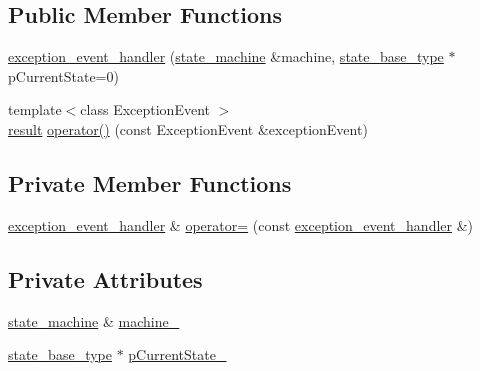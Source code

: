 \subsection*{Public Member Functions}
\begin{DoxyCompactItemize}
\item 
\mbox{\hyperlink{classboost_1_1statechart_1_1state__machine_1_1exception__event__handler_aa599923f8455a41fc5b3cb5f85696e37}{exception\+\_\+event\+\_\+handler}} (\mbox{\hyperlink{classboost_1_1statechart_1_1state__machine}{state\+\_\+machine}} \&machine, \mbox{\hyperlink{classboost_1_1statechart_1_1state__machine_a69cc258c29fcabec25c5dc8bedb7d530}{state\+\_\+base\+\_\+type}} $\ast$p\+Current\+State=0)
\item 
{\footnotesize template$<$class Exception\+Event $>$ }\\\mbox{\hyperlink{namespaceboost_1_1statechart_abe807f6598b614d6d87bb951ecd92331}{result}} \mbox{\hyperlink{classboost_1_1statechart_1_1state__machine_1_1exception__event__handler_ab9b740e63c87c7de5e0890951bdc5e69}{operator()}} (const Exception\+Event \&exception\+Event)
\end{DoxyCompactItemize}
\subsection*{Private Member Functions}
\begin{DoxyCompactItemize}
\item 
\mbox{\hyperlink{classboost_1_1statechart_1_1state__machine_1_1exception__event__handler}{exception\+\_\+event\+\_\+handler}} \& \mbox{\hyperlink{classboost_1_1statechart_1_1state__machine_1_1exception__event__handler_aeb4e0a3fcad26c9e187369570563d1dc}{operator=}} (const \mbox{\hyperlink{classboost_1_1statechart_1_1state__machine_1_1exception__event__handler}{exception\+\_\+event\+\_\+handler}} \&)
\end{DoxyCompactItemize}
\subsection*{Private Attributes}
\begin{DoxyCompactItemize}
\item 
\mbox{\hyperlink{classboost_1_1statechart_1_1state__machine}{state\+\_\+machine}} \& \mbox{\hyperlink{classboost_1_1statechart_1_1state__machine_1_1exception__event__handler_a72a5fde90e24066f54b90f96b7bbed24}{machine\+\_\+}}
\item 
\mbox{\hyperlink{classboost_1_1statechart_1_1state__machine_a69cc258c29fcabec25c5dc8bedb7d530}{state\+\_\+base\+\_\+type}} $\ast$ \mbox{\hyperlink{classboost_1_1statechart_1_1state__machine_1_1exception__event__handler_a215e864f3ab619e4ab2ed7fa73e28dbe}{p\+Current\+State\+\_\+}}
\end{DoxyCompactItemize}


